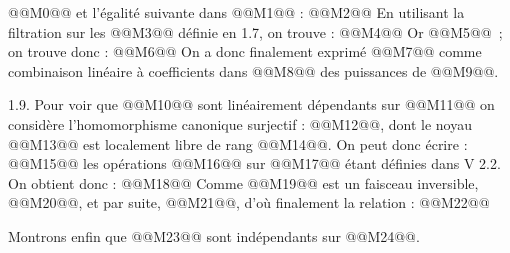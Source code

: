 
@@M0@@
et l'égalité suivante dans @@M1@@ :
@@M2@@
En utilisant la filtration sur les @@M3@@ définie en 1.7, on trouve :
@@M4@@
Or @@M5@@~; on trouve donc :
@@M6@@
On a donc finalement exprimé @@M7@@ comme combinaison linéaire à coefficients dans @@M8@@ des puissances de @@M9@@.

1.9. Pour voir que @@M10@@ sont linéairement dépendants sur @@M11@@ on considère l'homomorphisme canonique surjectif : @@M12@@, dont le noyau @@M13@@ est localement libre de rang @@M14@@. On peut donc écrire :
@@M15@@
les opérations @@M16@@ sur @@M17@@ étant définies dans V 2.2. On obtient donc :
@@M18@@
Comme @@M19@@ est un faisceau inversible, @@M20@@, et par suite, @@M21@@, d'où finalement la relation :
@@M22@@

Montrons enfin que @@M23@@ sont indépendants sur @@M24@@.


